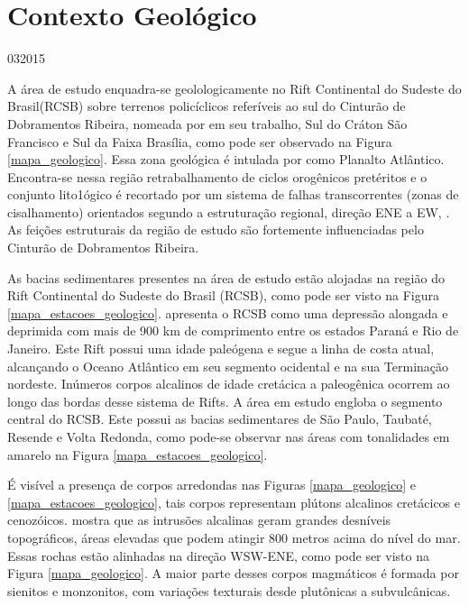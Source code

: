 \chapter{Contexto Geológico}
\date{24}{03}{2015}


A área de estudo enquadra-se geolologicamente no Rift Continental do Sudeste do Brasil(RCSB) sobre terrenos policíclicos referíveis ao sul do Cinturão de Dobramentos Ribeira, nomeada por \cite{Riccomini_1989} em seu trabalho, Sul do Cráton São Francisco e Sul da Faixa Brasília, como pode ser observado na Figura \ref{mapa_geologico}. Essa zona geológica é intulada por \cite{Almeida_Carneiro_1998} como Planalto Atlântico. Encontra-se nessa região retrabalhamento de ciclos orogênicos pretéritos e o conjunto lito1ógico é recortado por um sistema de falhas transcorrentes (zonas de cisalhamento) orientados segundo a estruturação regional, direção ENE a EW, \cite{Hasui_Sadowski_1976}. As feições estruturais da região de estudo são fortemente influenciadas pelo Cinturão de Dobramentos Ribeira.

As bacias sedimentares presentes na área de estudo estão alojadas na região do Rift Continental do Sudeste do Brasil (RCSB), como pode ser visto na Figura \ref{mapa_estacoes_geologico}. \cite{Riccomini_1989} apresenta o RCSB como uma depressão alongada e deprimida com mais de 900 km de comprimento entre os estados Paraná e Rio de Janeiro. Este Rift possui uma idade paleógena e segue a linha de costa atual, alcançando o Oceano Atlântico em seu segmento ocidental e na sua Terminação nordeste. Inúmeros corpos alcalinos de idade cretácica a paleogênica ocorrem ao longo das bordas desse sistema de Rifts. A área em estudo engloba o segmento central do RCSB. Este possui as bacias sedimentares de São Paulo, Taubaté, Resende e Volta Redonda, como pode-se observar nas áreas com tonalidades em amarelo na Figura \ref{mapa_estacoes_geologico}. 

É visível a presença de corpos arredondas nas Figuras \ref{mapa_geologico} e \ref{mapa_estacoes_geologico}, tais corpos representam plútons alcalinos cretácicos e cenozóicos. \cite{MOTA_2012} mostra que as intrusões alcalinas geram grandes desníveis topográficos, áreas elevadas que podem atingir 800 metros acima do nível do mar. Essas rochas estão alinhadas na direção WSW-ENE, como pode ser visto na Figura \ref{mapa_geologico}. A maior parte desses corpos magmáticos é formada por sienitos e monzonitos, com variações texturais desde plutônicas a subvulcânicas.

